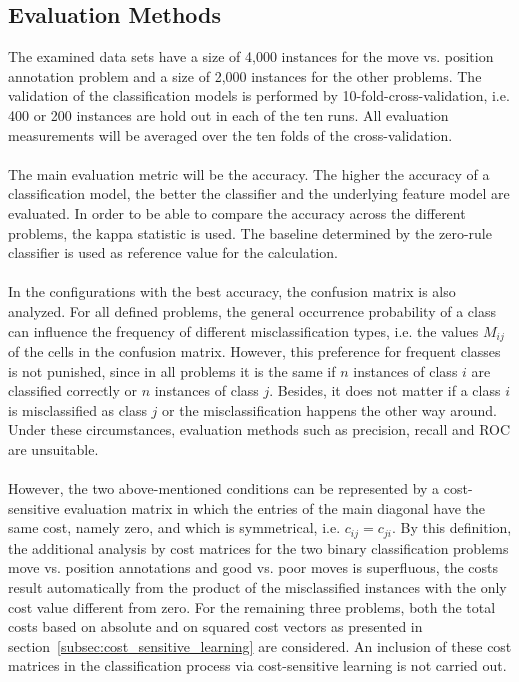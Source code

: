 \documentclass[article,type=msc,colorback,accentcolor=tud7b]{tudthesis}
\begin{document}
  \subsection{Evaluation Methods}    
  \label{subsec:evaluation_methods}
    The examined data sets have a size of 4,000 instances for the move vs. position annotation problem and a size of 2,000 instances for the other problems. The validation of the classification models is performed by 10-fold-cross-validation, i.e. 400 or 200 instances are hold out in each of the ten runs. All evaluation measurements will be averaged over the ten folds of the cross-validation. \\\\
    The main evaluation metric will be the accuracy. The higher the accuracy of a classification model, the better the classifier and the underlying feature model are evaluated. In order to be able to compare the accuracy across the different problems, the kappa statistic is used. The baseline determined by the zero-rule classifier is used as reference value for the calculation. \\\\
    In the configurations with the best accuracy, the confusion matrix is also analyzed. For all defined problems, the general occurrence probability of a class can influence the frequency of different misclassification types, i.e. the values $M_{ij}$ of the cells in the confusion matrix. However, this preference for frequent classes is not punished, since in all problems it is the same if $n$ instances of class $i$ are classified correctly or $n$ instances of class $j$. Besides, it does not matter if a class $i$ is misclassified as class $j$ or the misclassification happens the other way around. Under these circumstances, evaluation methods such as precision, recall and ROC are unsuitable. \\\\
However, the two above-mentioned conditions can be represented by a cost-sensitive evaluation matrix in which the entries of the main diagonal have the same cost, namely zero, and which is symmetrical, i.e. $c_{ij}=c_{ji}$. By this definition, the additional analysis by cost matrices for the two binary classification problems move vs. position annotations and good vs. poor moves is superfluous, the costs result automatically from the product of the misclassified instances with the only cost value different from zero. For the remaining three problems, both the total costs based on absolute and on squared cost vectors as presented in section~\ref{subsec:cost_sensitive_learning} are considered. An inclusion of these cost matrices in the classification process via cost-sensitive learning is not carried out.
  \clearpage  
  
\end{document}
